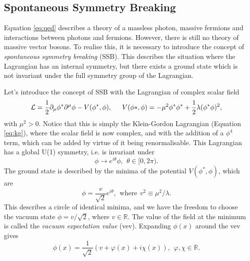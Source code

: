 \subsection{Spontaneous Symmetry Breaking}

Equation \ref{eq:qed} describes a theory of a massless photon, massive fermions and interactions between photons and fermions. However, there is still no theory of massive vector bosons. To realise this, it is necessary to introduce the concept of \textit{spontaneous symmetry breaking} (SSB). This describes the situation where the Lagrangian has an internal symmetry, but there exists a ground state which is not invariant under the full symmetry group of the Lagrangian. 

Let's introduce the concept of SSB with the Lagrangian of complex scalar field %
\begin{equation}\label{eq:generalu1}
    \mathcal{L}=\frac{1}{2}\partial_\mu\phi^*\partial^\mu\phi-V(\phi^*,\phi),\hspace{15pt} V(\phi*,\phi) = -\mu^2\phi^*\phi^*+\frac{1}{2}\lambda(\phi^*\phi)^2,
\end{equation}
with $\mu^2>0$. Notice that this is simply the Klein-Gordon Lagrangian (Equation \ref{eq:kg}), where the scalar field is now complex, and with the addition of a $\phi^4$ term, which can be added by virtue of it being renormalisable. This Lagrangian has a global U(1) symmetry, i.e. is invariant under 
\begin{equation}
\phi\rightarrow\!e^{i\theta}\phi,\hspace{5pt}\theta\in[0,2\pi).
\end{equation}
The ground state is described by the minima of the potential $V(\phi^*,\phi)$, which are
\begin{equation}
   \phi=\frac{v}{\sqrt{2}}e^{i\theta}, \hspace{5pt}\text{where}\hspace{5pt}v^2\equiv\mu^2/\lambda.
\end{equation}
This describes a circle of identical minima, and we have the freedom to choose the vacuum state $\phi=v/\sqrt{2}$, where $v\in\mathds{R}$. The value of the field at the minimum is called the \textit{vacuum expectation value} (vev). Expanding $\phi(x)$ around the vev gives
\begin{equation}
    \phi(x)=\frac{1}{\sqrt{2}}(v+\varphi(x)+i\chi(x)),\hspace{5pt} \varphi,\chi\in\mathbb{R}.
\end{equation}
